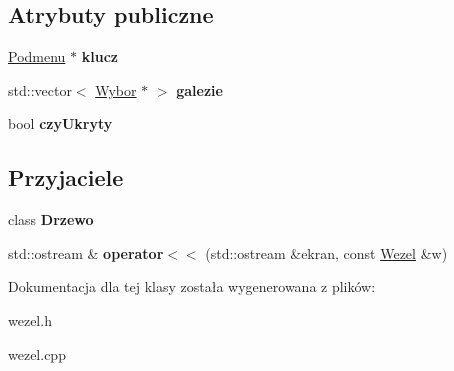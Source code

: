 \subsection*{Atrybuty publiczne}
\begin{DoxyCompactItemize}
\item 
\hypertarget{classWezel_a1600fecbcfc7f736f1136817bf135651}{\hyperlink{classPodmenu}{Podmenu} $\ast$ {\bfseries klucz}}\label{classWezel_a1600fecbcfc7f736f1136817bf135651}

\item 
\hypertarget{classWezel_a9a215722888660366488871033c07bb7}{std\-::vector$<$ \hyperlink{classWybor}{Wybor} $\ast$ $>$ {\bfseries galezie}}\label{classWezel_a9a215722888660366488871033c07bb7}

\item 
\hypertarget{classWezel_af479377c9d2b0696d646814bb11275be}{bool {\bfseries czy\-Ukryty}}\label{classWezel_af479377c9d2b0696d646814bb11275be}

\end{DoxyCompactItemize}
\subsection*{Przyjaciele}
\begin{DoxyCompactItemize}
\item 
\hypertarget{classWezel_a1c4e4c3515fb1b999118d69c354d7efd}{class {\bfseries Drzewo}}\label{classWezel_a1c4e4c3515fb1b999118d69c354d7efd}

\item 
\hypertarget{classWezel_ae9bc7cf50d659d3efd4cfd6a0e3126a7}{std\-::ostream \& {\bfseries operator$<$$<$} (std\-::ostream \&ekran, const \hyperlink{classWezel}{Wezel} \&w)}\label{classWezel_ae9bc7cf50d659d3efd4cfd6a0e3126a7}

\end{DoxyCompactItemize}


Dokumentacja dla tej klasy została wygenerowana z plików\-:\begin{DoxyCompactItemize}
\item 
wezel.\-h\item 
wezel.\-cpp\end{DoxyCompactItemize}
